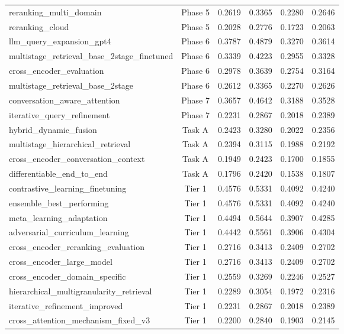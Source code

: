\documentclass[11pt]{article}
\begin{document}
\begin{longtable}{lccccc}
reranking\_multi\_domain & Phase 5 & 0.2619 & 0.3365 & 0.2280 & 0.2646 \\
reranking\_cloud & Phase 5 & 0.2028 & 0.2776 & 0.1723 & 0.2063 \\
llm\_query\_expansion\_gpt4 & Phase 6 & 0.3787 & 0.4879 & 0.3270 & 0.3614 \\
multistage\_retrieval\_base\_2stage\_finetuned & Phase 6 & 0.3339 & 0.4223 & 0.2955 & 0.3328 \\
cross\_encoder\_evaluation & Phase 6 & 0.2978 & 0.3639 & 0.2754 & 0.3164 \\
multistage\_retrieval\_base\_2stage & Phase 6 & 0.2612 & 0.3365 & 0.2270 & 0.2626 \\
conversation\_aware\_attention & Phase 7 & 0.3657 & 0.4642 & 0.3188 & 0.3528 \\
iterative\_query\_refinement & Phase 7 & 0.2231 & 0.2867 & 0.2018 & 0.2389 \\
hybrid\_dynamic\_fusion & Task A & 0.2423 & 0.3280 & 0.2022 & 0.2356 \\
multistage\_hierarchical\_retrieval & Task A & 0.2394 & 0.3115 & 0.1988 & 0.2192 \\
cross\_encoder\_conversation\_context & Task A & 0.1949 & 0.2423 & 0.1700 & 0.1855 \\
differentiable\_end\_to\_end & Task A & 0.1796 & 0.2420 & 0.1538 & 0.1807 \\
contrastive\_learning\_finetuning & Tier 1 & 0.4576 & 0.5331 & 0.4092 & 0.4240 \\
ensemble\_best\_performing & Tier 1 & 0.4576 & 0.5331 & 0.4092 & 0.4240 \\
meta\_learning\_adaptation & Tier 1 & 0.4494 & 0.5644 & 0.3907 & 0.4285 \\
adversarial\_curriculum\_learning & Tier 1 & 0.4442 & 0.5561 & 0.3906 & 0.4304 \\
cross\_encoder\_reranking\_evaluation & Tier 1 & 0.2716 & 0.3413 & 0.2409 & 0.2702 \\
cross\_encoder\_large\_model & Tier 1 & 0.2716 & 0.3413 & 0.2409 & 0.2702 \\
cross\_encoder\_domain\_specific & Tier 1 & 0.2559 & 0.3269 & 0.2246 & 0.2527 \\
hierarchical\_multigranularity\_retrieval & Tier 1 & 0.2289 & 0.3054 & 0.1972 & 0.2316 \\
iterative\_refinement\_improved & Tier 1 & 0.2231 & 0.2867 & 0.2018 & 0.2389 \\
cross\_attention\_mechanism\_fixed\_v3 & Tier 1 & 0.2200 & 0.2840 & 0.1903 & 0.2145 \\

\end{longtable}
\end{document}
